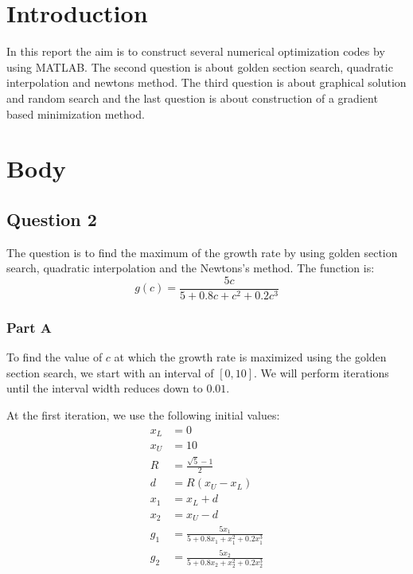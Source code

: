 \documentclass[12pt, a4paper]{article}
\numberwithin{equation}{section}
\begin{document}


\newpage
    \renewcommand{\contentsname}{Table of Contents}
    \tableofcontents
    \listoffigures
    \listoftables
\newpage

\section{Introduction}

In this report the aim is to construct several numerical optimization codes by using MATLAB. The second question is about golden section search, quadratic interpolation and newtons method. The third question is about graphical solution and random search and the last question is about construction of a gradient based minimization method.

\section{Body}
\subsection{Question 2}
The question is to find the maximum of the growth rate by using golden section search, quadratic interpolation and the Newtons's method.
The function is:
\begin{equation}
g(c) = \frac{5c}{5+0.8c+c^2+0.2c^3}
\end{equation}

\subsubsection{Part A}

To find the value of $c$ at which the growth rate is maximized using the golden section search, we start with an interval of $[0,10]$. We will perform iterations until the interval width reduces down to $0.01$.

At the first iteration, we use the following initial values:
\begin{equation}
\begin{align}
x_L &= 0 \\
x_U &= 10 \\
R &= \frac{\sqrt{5} - 1}{2}\\
d &= R(x_U - x_L)\\
x_1 &= x_L + d\\
x_2 &= x_U - d\\
g_1 &= \frac{5x_1}{5 + 0.8x_1 + x_1^2 + 0.2x_1^3}\\
g_2 &= \frac{5x_2}{5 + 0.8x_2 + x_2^2 + 0.2x_2^3}\\
\end{align}
\end{equation}
\end{document}
